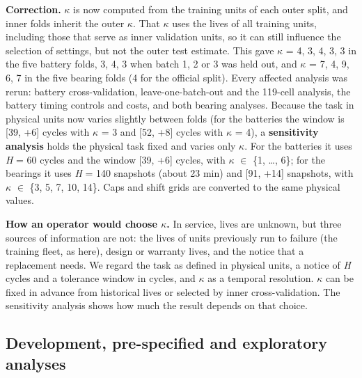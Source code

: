 \documentclass[a4paper,fleqn,doubleblind]{cas-dc}
\begin{document}
\textbf{Correction.} $\kappa$ is now computed from the training units of each outer split, and inner folds inherit the outer $\kappa$. That $\kappa$ uses the lives of all training units, including those that serve as inner validation units, so it can still influence the selection of settings, but not the outer test estimate. This gave $\kappa$ = 4, 3, 4, 3, 3 in the five battery folds, 3, 4, 3 when batch 1, 2 or 3 was held out, and $\kappa$ = 7, 4, 9, 6, 7 in the five bearing folds (4 for the official split). Every affected analysis was rerun: battery cross-validation, leave-one-batch-out and the 119-cell analysis, the battery timing controls and costs, and both bearing analyses. Because the task in physical units now varies slightly between folds (for the batteries the window is [\textminus{}39, +6] cycles with $\kappa$ = 3 and [\textminus{}52, +8] cycles with $\kappa$ = 4), a \textbf{sensitivity analysis} holds the physical task fixed and varies only $\kappa$. For the batteries it uses \textit{H} = 60 cycles and the window [\textminus{}39, +6] cycles, with $\kappa$ $\in$ \{1, \ldots{}, 6\}; for the bearings it uses \textit{H} = 140 snapshots (about 23 min) and [\textminus{}91, +14] snapshots, with $\kappa$ $\in$ \{3, 5, 7, 10, 14\}. Caps and shift grids are converted to the same physical values.

\textbf{How an operator would choose $\kappa$.} In service, lives are unknown, but three sources of information are not: the lives of units previously run to failure (the training fleet, as here), design or warranty lives, and the notice that a replacement needs. We regard the task as defined in physical units, a notice of \textit{H} cycles and a tolerance window in cycles, and $\kappa$ as a temporal resolution. $\kappa$ can be fixed in advance from historical lives or selected by inner cross-validation. The sensitivity analysis shows how much the result depends on that choice.

\subsection{Development, pre-specified and exploratory analyses}
\end{document}
